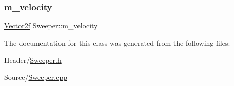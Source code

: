 \mbox{\label{class_sweeper_aeda6c4d7941d3715a6c5ff55c8688fa5}} 
\subsubsection{\texorpdfstring{m\_velocity}{m\_velocity}}
{\footnotesize\ttfamily \mbox{\hyperlink{class_vector2f}{Vector2f}} Sweeper\+::m\+\_\+velocity}



The documentation for this class was generated from the following files\+:\begin{DoxyCompactItemize}
\item 
Header/\mbox{\hyperlink{_sweeper_8h}{Sweeper.\+h}}\item 
Source/\mbox{\hyperlink{_sweeper_8cpp}{Sweeper.\+cpp}}\end{DoxyCompactItemize}

